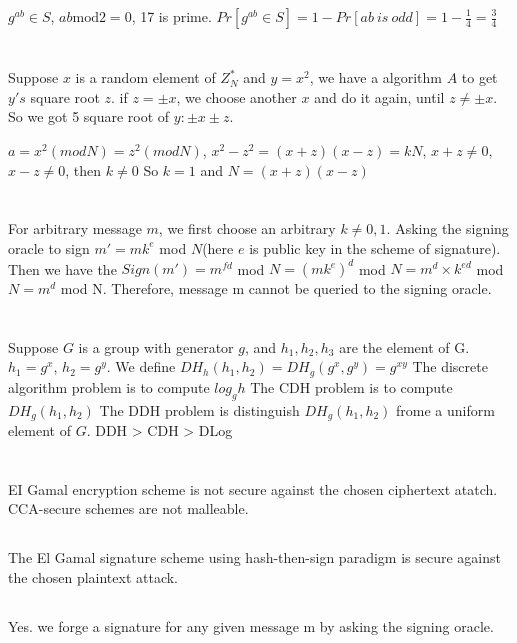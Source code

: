 \documentclass[onecolumn,oneside]{SUSTechHomework}
\begin{document}
  $g^{ab} \in S$,
  $ab \mbox{mod} 2 = 0$, 17 is prime.
  $Pr[g^{ab} \in S]=1-Pr[ab~is~odd]=1-\frac{1}{4}=\frac{3}{4}$
  
\section{}

Suppose $x$ is a random element of $Z_N^*$ and $y=x^2$, we have a algorithm $A$ to get $y's$ square root $z$.
if $z = \pm x$, we choose another $x$ and do it again, until $z \neq \pm x$.
So we got 5 square root of $y: \pm x \pm z$.

$a = x^2 (mod N) = z^2 (mod N)$, $x^2-z^2=(x+z)(x-z) = kN$, $x+z \neq 0$, $x-z \neq 0$, then $k \neq 0$
So $k=1$ and $N=(x+z)(x-z)$

\section{}

For arbitrary message $m$, we first choose an arbitrary $k \neq 0,1$.
Asking the signing oracle to sign $m' = mk^e$ mod $N$(here $e$ is public key in the scheme of signature).
Then we have the $Sign(m') = m^{fd}$ mod $N=(mk^e)^d$ mod $N=m^d \times k^{ed}$ mod $N=m^d$ mod N.
Therefore, message m cannot be queried to the signing oracle.

\section{}

Suppose $G$ is a group with generator $g$, and $h_1, h_2, h_3$ are the element of G.
$h_1 = g^x$, $h_2=g^y$.
We define $DH_h(h_1,h_2)=DH_g(g^x, g^y)=g^{xy}$
The discrete algorithm problem is to compute $log_gh$
The CDH problem is to compute $DH_g(h_1,h_2)$
The DDH problem is distinguish $DH_g(h_1,h_2)$ frome a uniform element of $G$.
DDH > CDH > DLog

\section{}

  \subsection{}
  
  EI Gamal encryption scheme is not secure against the chosen ciphertext atatch.
  CCA-secure schemes are not malleable.

  \subsection{}
  The El Gamal signature scheme using hash-then-sign paradigm is secure against the chosen plaintext attack.

  \subsection{}
  Yes. we forge a signature for any given message m by asking the signing oracle.
\end{document}
